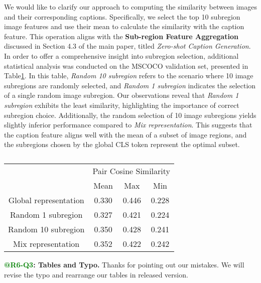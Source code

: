 \documentclass[letterpaper]{article} %
\begin{document}
We would like to clarify our approach to computing the similarity between images and their corresponding captions. Specifically, we select the top 10 subregion image features and use their mean to calculate the similarity with the caption feature. This operation aligns with the \textbf{Sub-region Feature Aggregation} discussed in Section 4.3 of the main paper, titled \textit{Zero-shot Caption Generation}. In order to offer a comprehensive insight into subregion selection, additional statistical analysis was conducted on the MSCOCO validation set, presented in Table\ref{table:subregion_abliation}. In this table, \textit{Random 10 subregion} refers to the scenario where 10 image subregions are randomly selected, and \textit{Random 1 subregion} indicates the selection of a single random image subregion. Our observations reveal that \textit{Random 1 subregion} exhibits the least similarity, highlighting the importance of correct subregion choice. Additionally, the random selection of 10 image subregions yields slightly inferior performance compared to \textit{Mix representation}. This suggests that the caption feature aligns well with the mean of a subset of image regions, and the subregions chosen by the global CLS token represent the optimal subset.

\begin{table}[b]
\small
\centering
\tabcolsep=2pt
\begin{tabular}{c|ccc}
\hline
\multirow{2}{*}{} & \multicolumn{3}{l}{Pair Cosine Similarity} \\
                         & Mean        & Max        & Min        \\ \hline
 Global representation           & 0.330       & 0.446      & 0.228      \\ \hline
Random 1 subregion             & 0.327       & 0.421      & 0.224      \\ \hline
Random 10 subregion             & 0.350       & 0.428      & 0.241      \\ \hline
Mix representation             & 0.352       & 0.422      & 0.242      \\ \hline
\end{tabular}
\caption{}
\label{table:subregion_abliation}
\end{table}


\noindent \textbf{\textcolor{Green}{@R6-Q3}: Tables and Typo.}
Thanks for pointing out our mistakes. We will revise the typo and rearrange our tables in released version.


% 
\end{document}
